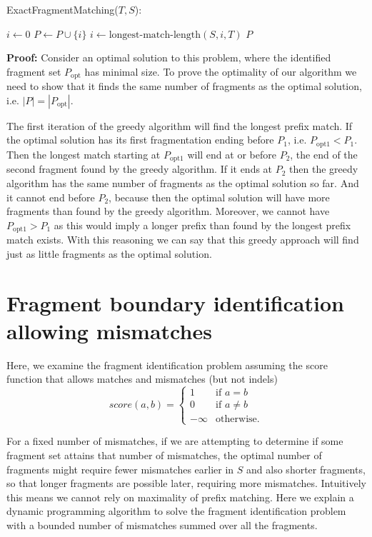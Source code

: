 \begin{algorithm}[H]
\caption{ExactFragmentMatching($T, S$):}
\begin{algorithmic}[1]
  \STATE $i \leftarrow 0$
    \STATE $P \leftarrow P\cup \{i\}$
    \STATE $i \leftarrow \text{longest-match-length}(S,i,T)$
  \ENDWHILE
  \RETURN $P$
\end{algorithmic}
\end{algorithm}

\textbf{Proof:} Consider an optimal solution to this problem, where the
identified fragment set $P_{\mathrm{opt}}$ has minimal size. To prove
the optimality of our algorithm we need to show that it finds the same
number of fragments as the optimal solution, i.e. $|P| =
|P_{\mathrm{opt}}|$.

The first iteration of the greedy algorithm will find the longest prefix
match. If the optimal solution has its first fragmentation ending before
$P_1$, i.e. $P_{\mathrm{opt1}} < P_1$. Then the longest match starting at
$P_{\mathrm{opt1}}$ will end at or before $P_2$, the end of the second
fragment found by the greedy algorithm. If it ends at $P_2$ then the
greedy algorithm has the same number of fragments as the optimal
solution so far. And it cannot end before $P_2$, because then the
optimal solution will have more fragments than found by the greedy
algorithm. Moreover, we cannot have $P_{\mathrm{opt1}} > P_1$ as this
would imply a longer prefix than found by the longest prefix match
exists. With this reasoning we can say that this greedy approach will
find just as little fragments as the optimal solution.

\section{Fragment boundary identification allowing mismatches}
Here, we examine the fragment identification problem assuming the score
function that allows matches and mismatches (but not indels)
\[score(a,b)=
\begin{cases}
  1 & \text{if } a = b \\
  0 & \text{if } a \neq b \\
  -\infty & \text{otherwise.}
\end{cases}\]

For a fixed number of mismatches, if we are attempting to determine if
some fragment set attains that number of mismatches, the optimal number
of fragments might require fewer mismatches earlier in $S$ and also
shorter fragments, so that longer fragments are possible later,
requiring more mismatches. Intuitively this means we cannot rely on
maximality of prefix matching. Here we explain a dynamic programming
algorithm to solve the fragment identification problem with a bounded
number of mismatches summed over all the fragments.

